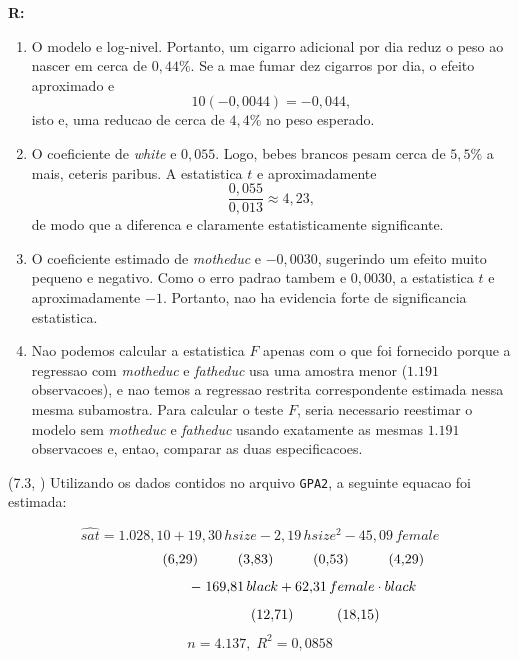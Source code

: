 \documentclass[12pt,letterpaper, onecolumn]{exam}
\renewenvironment{solution}
{\par\noindent\textbf{R:}\enspace\color{blue}}
{\par\color{black}}
\begin{document}
\begin{questions}
\begin{solution}
\begin{enumerate}[label=(\roman*)]
    \item O modelo e log-nivel. Portanto, um cigarro adicional por dia reduz o peso ao nascer em cerca de \(0,44\%\). Se a mae fumar dez cigarros por dia, o efeito aproximado e
    \[
    10(-0,0044) = -0,044,
    \]
    isto e, uma reducao de cerca de \(4,4\%\) no peso esperado.

    \item O coeficiente de \textit{white} e \(0,055\). Logo, bebes brancos pesam cerca de \(5,5\%\) a mais, ceteris paribus. A estatistica \(t\) e aproximadamente
    \[
    \frac{0,055}{0,013}\approx 4,23,
    \]
    de modo que a diferenca e claramente estatisticamente significante.

    \item O coeficiente estimado de \textit{motheduc} e \(-0,0030\), sugerindo um efeito muito pequeno e negativo. Como o erro padrao tambem e \(0,0030\), a estatistica \(t\) e aproximadamente \(-1\). Portanto, nao ha evidencia forte de significancia estatistica.

    \item Nao podemos calcular a estatistica \(F\) apenas com o que foi fornecido porque a regressao com \textit{motheduc} e \textit{fatheduc} usa uma amostra menor (\(1.191\) observacoes), e nao temos a regressao restrita correspondente estimada nessa mesma subamostra. Para calcular o teste \(F\), seria necessario reestimar o modelo sem \textit{motheduc} e \textit{fatheduc} usando exatamente as mesmas \(1.191\) observacoes e, entao, comparar as duas especificacoes.
\end{enumerate}
\end{solution}

\vspace{0.7cm}

\question (7.3, \citep{wooldridge2016}) Utilizando os dados contidos no arquivo \texttt{GPA2}, a seguinte equacao foi estimada:

\[
\widehat{sat} = 1{.}028{,}10 + 19{,}30\,hsize - 2{,}19\,hsize^2 - 45{,}09\,female
\]
\[
\hspace{1.7cm} (6{,}29)\hspace{1.0cm}(3{,}83)\hspace{1.0cm}(0{,}53)\hspace{1.0cm}(4{,}29)
\]
\[
\hspace{2.2cm} -\; 169{,}81\,black + 62{,}31\,female \cdot black
\]
\[
\hspace{2.8cm} (12{,}71)\hspace{1.1cm}(18{,}15)
\]
\[
n = 4{.}137,\; R^2 = 0{,}0858
\]


\end{questions}
\end{document}

